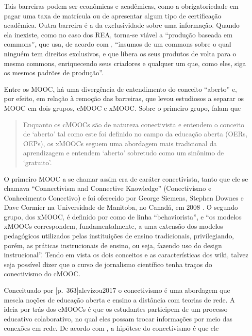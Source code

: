 \documentclass{textolivre}
\begin{document}
Tais barreiras podem ser econômicas e acadêmicas, como a obrigatoriedade em pagar uma taxa de matrícula ou de apresentar algum tipo de certificação acadêmica. Outra barreira é a da exclusividade sobre uma informação. Quando ela inexiste, como no caso dos REA, torna-se viável a “produção baseada em commons”, que usa, de acordo com \textcite[p.~18]{benkler2009}, “insumos de um commons sobre o qual ninguém tem direitos exclusivos, e que libera os seus produtos de volta para o mesmo commons, enriquecendo seus criadores e qualquer um que, como eles, siga os mesmos padrões de produção”. 

Entre os MOOC, há uma divergência de entendimento do conceito “aberto” e, por efeito, em relação à remoção das barreiras, que levou estudiosos a separar os MOOC em dois grupos, cMOOC e xMOOC. Sobre o primeiro grupo, \textcite[p.~6]{teixeira2015} falam que

\begin{quote}
Enquanto os cMOOCs são de natureza conectivista e entendem o conceito de ‘aberto’ tal como este foi definido no campo da educação aberta (OERs, OEPs), os xMOOCs seguem uma abordagem mais tradicional da aprendizagem e entendem ‘aberto’ sobretudo como um sinônimo de ‘gratuito’.
\end{quote}
	
O primeiro MOOC a se chamar assim era de caráter conectivista, tanto que ele se chamava “Connectivism and Connective Knowledge” (Conectivismo e Conhecimento Conectivo) e foi oferecido por George Siemens, Stephen Downes e Dave Cormier na Universidade de Manitoba, no Canadá, em 2008 \cite[p.~5]{teixeira2015}. O segundo grupo, dos xMOOC, é definido por \textcite[p.~185]{forno2013} como de linha “behaviorista”, e “os modelos xMOOCs correspondem, fundamentalmente, a uma extensão dos modelos pedagógicos utilizados pelas instituições de ensino tradicionais, privilegiando, porém, as práticas instrucionais de ensino, ou seja, fazendo uso do design instrucional”. Tendo em vista os dois conceitos e as características dos wiki, talvez seja possível dizer que o curso de jornalismo científico tenha traços do conectivismo do cMOOC.

Conceituado por [p.~363]{alevizou2017} o conectivismo é uma abordagem que mescla noções de educação aberta e ensino a distância com teorias de rede. A ideia por trás dos cMOOCs é que os estudantes participem de um processo educativo colaborativo, no qual eles possam trocar informações por meio das conexões em rede. De acordo com \textcite[p. 365]{alevizou2017}, a hipótese do conectivismo é que ele 
\end{document}
